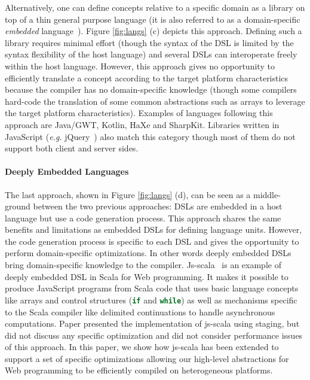 \documentclass{llncs}
\newcommand{\code}[1]{\lstinline[language=Scala,columns=fixed,basicstyle=\footnotesize]|#1|}
\newcommand{\eg}{\emph{e.g.}}
\begin{document}
Alternatively, one can define concepts relative to a specific domain as a library on top of a thin
general purpose language (it is also referred to as a domain-specific \emph{embedded}
language~\cite{Hudak96_DSEL}). Figure \ref{fig:langs} (c) depicts this approach. Defining such a
library requires minimal effort (though the syntax of the DSL is limited by the syntax flexibility
of the host language) and several DSLs can interoperate freely within the host language. However,
this approach gives no opportunity to efficiently translate a concept according to the target
platform characteristics because the compiler has no domain-specific knowledge (though some
compilers hard-code the translation of some common abstractions such as arrays to leverage the
target platform characteristics). Examples of languages following this approach are Java/GWT,
Kotlin, HaXe and SharpKit. Libraries written in JavaScript (\eg{} jQuery~\cite{Bibeault08_jQuery}) also match this category though most of them do not support both client and server sides.

\paragraph{Deeply Embedded Languages}

The last approach, shown in Figure \ref{fig:langs} (d), can be seen as a middle-ground between the
two previous approaches: DSLs are embedded in a host language but use a code generation process.
This approach shares the same benefits and limitations as embedded DSLs for defining language units.
However, the code generation process is specific to each DSL and gives the opportunity to perform
domain-specific optimizations. In other words deeply embedded DSLs bring domain-specific knowledge
to the compiler. Js-scala~\cite{Kossakowski12_JsDESL} is an example of deeply embedded DSL in Scala
for Web programming. It makes it possible to produce JavaScript programs from Scala code that uses
basic language concepts like arrays and control structures (\code{if} and \code{while}) as well as
mechanisms specific to the Scala compiler like delimited continuations to handle asynchronous
computations. Paper \cite{Kossakowski12_JsDESL} presented the implementation of js-scala using staging, but did not discuss any specific optimization and did not consider performance issues of this approach. In this paper, we show how js-scala has been extended to support a set of specific optimizations allowing our high-level abstractions for Web programming to be efficiently compiled on heterogeneous platforms.
\end{document}
